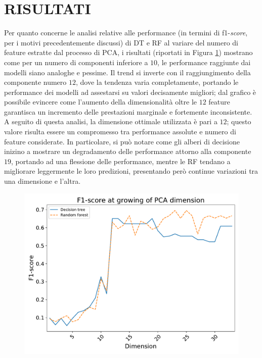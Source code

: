 \section{RISULTATI}
Per quanto concerne le analisi relative alle performance (in termini di f1-\textit{score}, per i motivi precedentemente discussi) di DT e RF al variare del numero di feature estratte dal processo di PCA, i risultati (riportati in Figura \ref{fig:pca-perf}) mostrano come per un numero di componenti inferiore a $10$, le performance raggiunte dai modelli siano analoghe e pessime. Il trend si inverte con il raggiungimento della componente numero $12$, dove la tendenza varia completamente, portando le performance dei modelli ad assestarsi su valori decisamente migliori; dal grafico è possibile evincere come l'aumento della dimensionalità oltre le $12$ feature garantisca un incremento delle prestazioni marginale e fortemente inconsistente.
A seguito di questa analisi, la dimensione ottimale utilizzata è pari a $12$; questo valore risulta essere un compromesso tra performance assolute e numero di feature considerate.
In particolare, si può notare come gli alberi di decisione inizino a mostrare un degradamento delle performance attorno alla componente $19$, portando ad una flessione delle performance, mentre le RF tendano a migliorare leggermente le loro predizioni, presentando però continue variazioni tra una dimensione e l'altra.
\begin{figure}
	\centering
	\includegraphics[width=0.9\linewidth]{images/pca-perf}
	\caption{}
	\label{fig:pca-perf}
\end{figure}


